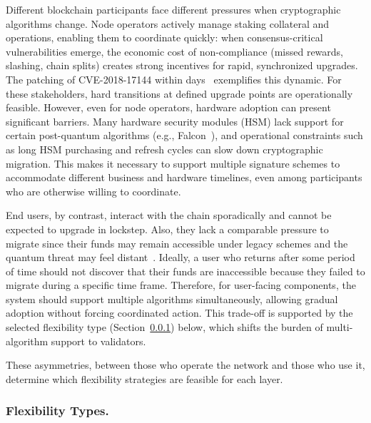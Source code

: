 Different blockchain participants face different pressures when cryptographic algorithms change.
Node operators actively manage staking collateral and operations, enabling them to coordinate quickly: when consensus-critical vulnerabilities emerge, the economic cost of non-compliance (missed rewards, slashing, chain splits) creates strong incentives for rapid, synchronized upgrades.
The patching of CVE-2018-17144 within days~\cite{bitcoin_cve2018} exemplifies this dynamic.
For these stakeholders, hard transitions at defined upgrade points are operationally feasible. 
However, even for node operators, hardware adoption can present significant barriers.
Many hardware security modules (HSM) lack support for certain post-quantum algorithms (e.g., Falcon~\cite{NISTPQC-R3:FALCON20}), and operational constraints such as long HSM purchasing and refresh cycles can slow down cryptographic migration.
This makes it necessary to support multiple signature schemes to accommodate different business and hardware timelines, even among participants who are otherwise willing to coordinate.

End users, by contrast, interact with the chain sporadically and cannot be expected to upgrade in lockstep.
Also, they lack a comparable pressure to migrate since their funds may remain accessible under legacy schemes and the quantum threat may feel distant~\cite{tectonic2025quantumdisconnect}.
Ideally, a user who returns after some period of time should not discover that their funds are inaccessible because they failed to migrate during a specific time frame.
Therefore, for user-facing components, the system should support multiple algorithms simultaneously, allowing gradual adoption without forcing coordinated action.
This trade-off is supported by the selected flexibility type (Section~\ref{subsubsec:flexibility-models}) below, which shifts the burden of multi-algorithm support to validators.

These asymmetries, between those who operate the network and those who use it, determine which flexibility strategies are feasible for each layer.

\subsubsection{Flexibility Types.}\label{subsubsec:flexibility-models}

